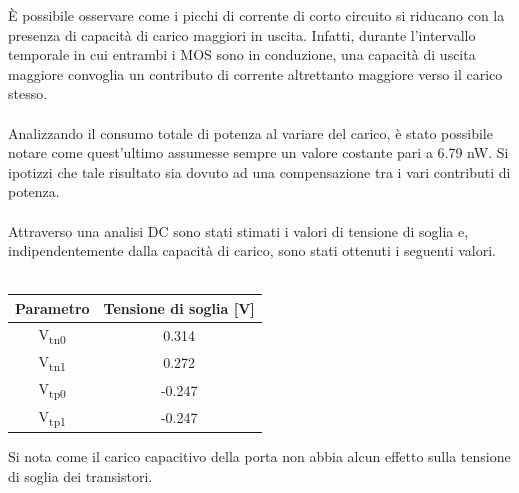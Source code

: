 \documentclass[11pt,  english, makeidx, a4paper, titlepage, oneside]{book}
\begin{document}
È possibile osservare come i picchi di corrente di corto circuito si riducano con la presenza di capacità di carico maggiori in uscita. Infatti, durante l'intervallo temporale in cui entrambi i MOS sono in conduzione, una capacità di uscita maggiore convoglia un contributo di corrente altrettanto maggiore verso il carico stesso.
\\\\
Analizzando il consumo totale di potenza al variare del carico, è stato possibile notare come quest'ultimo assumesse sempre un valore costante pari a 6.79 nW. Si ipotizzi che tale risultato sia dovuto ad una compensazione tra i vari contributi di potenza.
\\\\
Attraverso una analisi DC sono stati stimati i valori di tensione di soglia e, indipendentemente dalla capacità di carico, sono stati ottenuti i seguenti valori.
\\\\
\begin{center}
	\begin{tabular}{|c|c|}
	\hline
	Parametro & Tensione di soglia [V] \\
	\hline
	 V\textsubscript{tn0} & 0.314\\
	\hline
	 V\textsubscript{tn1} & 0.272 \\
	\hline
	V\textsubscript{tp0} & -0.247 \\
	\hline
	V\textsubscript{tp1} & -0.247 \\
	\hline
	\end{tabular}	
\end{center}
\vspace{0.3cm}
Si nota come il carico capacitivo della porta non abbia alcun effetto sulla tensione di soglia dei transistori.
\end{document}
